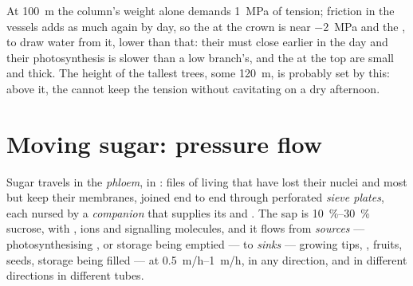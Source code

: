 \begin{example}\label{ex:b1:plant-transport:top}
At \qty{100}{m} the column's weight alone demands \qty{1}{MPa} of
tension; friction in the vessels adds as much again by day, so the
 at the crown is near \qty{-2}{MPa} and the  , to draw
water from it, lower than that: their  must close earlier in
the day and their photosynthesis is slower than a low branch's, and
the  at the top are small and thick. The height of the tallest
trees, some \qty{120}{m}, is probably set by this: above it, the 
cannot keep the tension without cavitating on a dry afternoon.
\end{example}

\section{Moving sugar: pressure flow}

\begin{definition}\label{def:b1:plant-transport:phloem}
Sugar travels in the \emph{phloem}, in \emph{}: files of
living  that have lost their nuclei and most  but keep
their membranes, joined end to end through perforated \emph{sieve
plates}, each  nursed by a \emph{companion } that supplies its
 and . The sap is \qtyrange{10}{30}{\%} sucrose, with , ions and signalling molecules, and it flows from
\emph{sources} --- photosynthesising , or storage  being
emptied --- to \emph{sinks} --- growing tips, , fruits, seeds,
storage  being filled --- at \qtyrange{0.5}{1}{m/h}, in any
direction, and in different directions in different tubes.
\end{definition}

